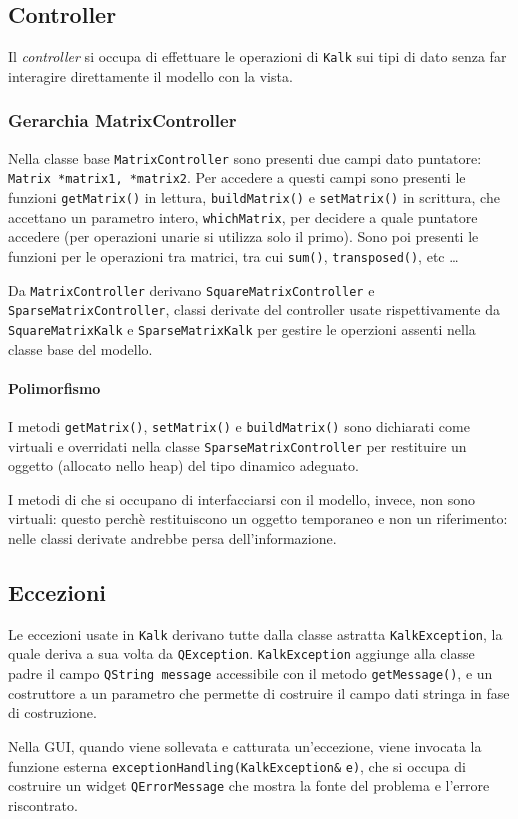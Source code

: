 \subsection{Controller}

Il \emph{controller} si occupa di effettuare le operazioni di \texttt{Kalk} sui tipi di dato senza far interagire direttamente il modello con la vista.

\subsubsection{Gerarchia MatrixController}

Nella classe base \texttt{MatrixController} sono presenti due campi dato puntatore: \texttt{Matrix *matrix1, *matrix2}. Per accedere a questi campi sono 
presenti le funzioni \texttt{getMatrix()} in lettura, \texttt{buildMatrix()} e \texttt{setMatrix()} in scrittura, che accettano un parametro 
intero, \texttt{whichMatrix}, per decidere a quale puntatore accedere (per operazioni unarie si utilizza solo il primo). 
Sono poi presenti le funzioni per le operazioni tra matrici, tra cui \texttt{sum()}, \texttt{transposed()}, etc \dots \par
Da \texttt{MatrixController} derivano \texttt{SquareMatrixController} e \texttt{SparseMatrixController}, classi derivate del controller usate rispettivamente 
da \texttt{SquareMatrixKalk} e \texttt{SparseMatrixKalk} per gestire le operzioni assenti nella classe base del modello.

\paragraph{Polimorfismo} 
I metodi \texttt{getMatrix()}, \texttt{setMatrix()} e \texttt{buildMatrix()} sono dichiarati come virtuali e overridati nella classe 
\texttt{SparseMatrixController} per restituire un oggetto (allocato nello heap) del tipo dinamico adeguato.\par
I metodi di che si occupano di interfacciarsi con il modello, invece, non sono virtuali: questo perchè restituiscono un oggetto 
temporaneo e non un riferimento: nelle classi derivate andrebbe persa dell'informazione.

\subsection{Eccezioni}

Le eccezioni usate in \texttt{Kalk} derivano tutte dalla classe astratta \texttt{KalkException}, la quale deriva a sua volta da \texttt{QException}.
\texttt{KalkException} aggiunge alla classe padre il campo \texttt{QString message} accessibile con il metodo \texttt{getMessage()}, e un 
costruttore a un parametro che permette di costruire il campo dati stringa in fase di costruzione. \par
Nella GUI, quando viene sollevata e catturata un'eccezione, viene invocata la funzione esterna \texttt{exceptionHandling(KalkException}\verb|&| \texttt{e)}, che si occupa di costruire un 
widget \texttt{QErrorMessage} che mostra la fonte del problema e l'errore riscontrato.

